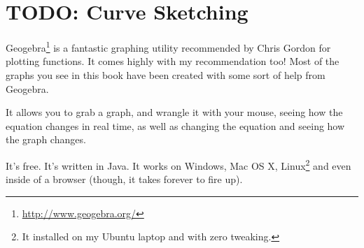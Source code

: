 \newpage
\section{TODO: Curve Sketching}
\label{sec:CurveSketching}
Geogebra\footnote{\url{http://www.geogebra.org/}} is a fantastic graphing
utility recommended by Chris Gordon for plotting functions. It comes highly with
my recommendation too! Most of the graphs you see in this book have been created
with some sort of help from Geogebra.

It allows you to grab a graph, and wrangle it with your mouse, seeing how
the equation changes in real time, as well as changing the equation and seeing
how the graph changes.

It's free.
It's written in Java.
It works on Windows, Mac OS X, Linux\footnote{It installed on my Ubuntu laptop
and with zero tweaking.} and even inside of a browser (though, it takes
forever to fire up).
